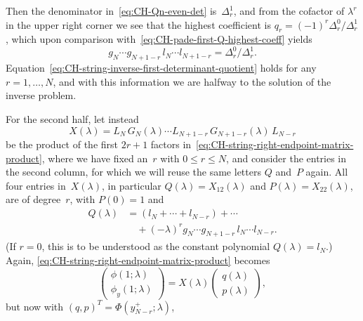 \documentclass[10pt,a4paper]{article} \pdfoutput=1 
\begin{document}
Then the denominator in~\eqref{eq:CH-Qn-even-det} is~$\Delta_r^1$,
and from the cofactor of $\lambda^r$ in the upper right corner
we see that the highest coefficient is
$q_r = (-1)^r \Delta_r^0 / \Delta_r^1$,
which upon comparison with~\eqref{eq:CH-pade-first-Q-highest-coeff}
yields
\begin{equation}
  \label{eq:CH-string-inverse-first-determinant-quotient}
  g_{N} \dotsm g_{N+1-r} \, l_{N} \dotsm l_{N+1-r}
  = \Delta_r^0 / \Delta_r^1
  .
\end{equation}
Equation~\eqref{eq:CH-string-inverse-first-determinant-quotient}
holds for any $r=1,\dots,N$, and with this information we are halfway
to the solution of the inverse problem.

For the second half, let instead
\begin{equation}
  \label{eq:CH-matrix-product-odd}
  X(\lambda) = L_N \, G_N(\lambda) \dotsm L_{N+1-r} \, G_{N+1-r}(\lambda) \, L_{N-r}
\end{equation}
be the product of the first $2r+1$
factors in~\eqref{eq:CH-string-right-endpoint-matrix-product},
where we have fixed an~$r$ with $0 \le r \le N$,
and consider the entries in the second column, for which we will reuse
the same letters $Q$ and~$P$ again.
All four entries in~$X(\lambda)$, in particular
$Q(\lambda) = X_{12}(\lambda)$ and $P(\lambda) = X_{22}(\lambda)$,
are of degree~$r$, with $P(0)=1$ and
\begin{equation}
  \label{eq:CH-pade-second-Q-highest-lowest-coeff}
  \begin{split}
    Q(\lambda)
    &
    = (l_N + \dotsb + l_{N-r})
    + \cdots
    \\ & \quad
    + (-\lambda)^{r} g_{N} \dotsm g_{N+1-r} \, l_{N} \dotsm l_{N-r}
    .
  \end{split}
\end{equation}
(If $r=0$, this is to be understood as the constant polynomial $Q(\lambda) = l_N$.)
Again, \eqref{eq:CH-string-right-endpoint-matrix-product} becomes
\begin{equation*}
  \begin{pmatrix}
    \phi(1;\lambda) \\
    \phi_y(1;\lambda)
  \end{pmatrix}
  = X(\lambda)
  \begin{pmatrix} q(\lambda) \\ p(\lambda) \end{pmatrix}
  ,
\end{equation*}
but now with
$(q,p)^T = \Phi(y_{N-r}^+;\lambda)$,
\end{document}
